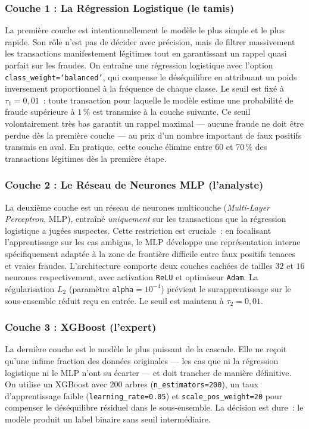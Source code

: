 \documentclass[a4paper]{article}
\begin{document}
\subsubsection*{Couche 1 : La Régression Logistique (le tamis)}
 
La première couche est intentionnellement le modèle le plus simple et le plus rapide. Son rôle n'est pas de décider avec précision, mais de filtrer massivement les transactions manifestement légitimes tout en garantissant un rappel quasi parfait sur les fraudes. On entraîne une régression logistique avec l'option \texttt{class\_weight=`balanced'}, qui compense le déséquilibre en attribuant un poids inversement proportionnel à la fréquence de chaque classe. Le seuil est fixé à $\tau_1 = 0{,}01$~: toute transaction pour laquelle le modèle estime une probabilité de fraude supérieure à $1\,\%$ est transmise à la couche suivante. Ce seuil volontairement très bas garantit un rappel maximal --- aucune fraude ne doit être perdue dès la première couche --- au prix d'un nombre important de faux positifs transmis en aval. En pratique, cette couche élimine entre 60 et 70\,\% des transactions légitimes dès la première étape.
 
\subsubsection*{Couche 2 : Le Réseau de Neurones MLP (l'analyste)}
 
La deuxième couche est un réseau de neurones multicouche (\textit{Multi-Layer Perceptron}, MLP), entraîné \emph{uniquement} sur les transactions que la régression logistique a jugées suspectes. Cette restriction est cruciale~: en focalisant l'apprentissage sur les cas ambigus, le MLP développe une représentation interne spécifiquement adaptée à la zone de frontière difficile entre faux positifs tenaces et vraies fraudes. L'architecture comporte deux couches cachées de tailles $32$ et $16$ neurones respectivement, avec activation \texttt{ReLU} et optimiseur \texttt{Adam}. La régularisation $L_2$ (paramètre \texttt{alpha}$= 10^{-4}$) prévient le surapprentissage sur le sous-ensemble réduit reçu en entrée. Le seuil est maintenu à $\tau_2 = 0{,}01$.
 
\subsubsection*{Couche 3 : XGBoost (l'expert)}
 
La dernière couche est le modèle le plus puissant de la cascade. Elle ne reçoit qu'une infime fraction des données originales --- les cas que ni la régression logistique ni le MLP n'ont su écarter --- et doit trancher de manière définitive. On utilise un XGBoost avec 200 arbres (\texttt{n\_estimators=200}), un taux d'apprentissage faible (\texttt{learning\_rate=0.05}) et \texttt{scale\_pos\_weight=20} pour compenser le déséquilibre résiduel dans le sous-ensemble. La décision est dure~: le modèle produit un label binaire sans seuil intermédiaire.
 
\end{document}
